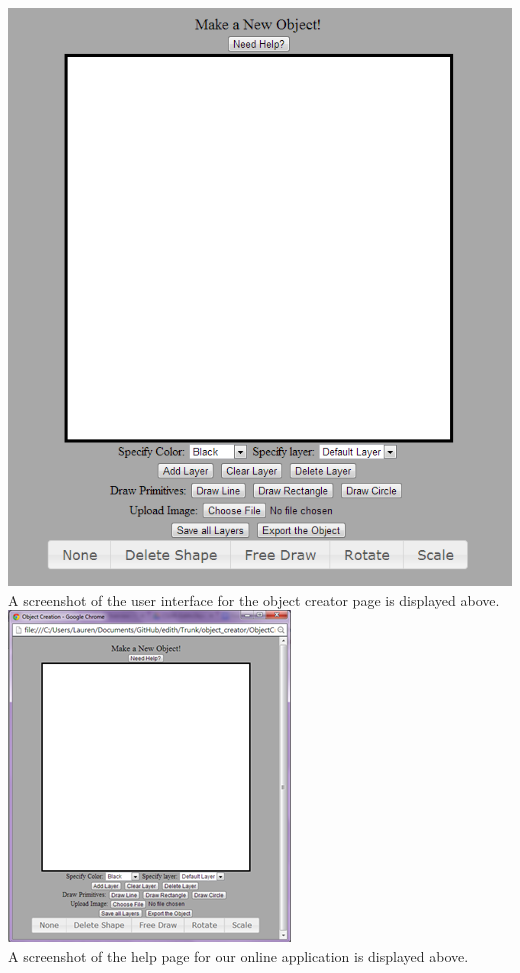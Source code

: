 \documentclass[a4paper, 11pt]{article} %
\begin{document}
\includegraphics[scale=.7]{mainpage}\\
A screenshot of the user interface for the object creator page is displayed above.\\
\includegraphics[scale=.8]{helppage}\\
A screenshot of the help page for our online application is displayed above.
\end{document}
